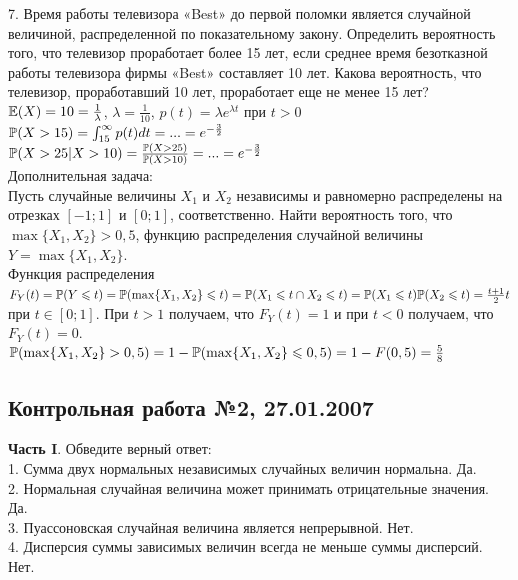 \documentclass[12pt, a4paper]{article}\usepackage[]{graphicx}\usepackage[]{color}
\begin{document}
	7.  Время работы телевизора «Best» до первой поломки является
	случайной величиной, распределенной по показательному закону.
	Определить вероятность того, что телевизор проработает более 15
	лет, если среднее время безотказной работы телевизора фирмы «Best»
	составляет 10 лет. Какова вероятность, что телевизор,
	проработавший 10 лет, проработает еще не менее 15 лет? \\

	$\E(X)=10=\frac{1}{\lambda}$, $\lambda=\frac{1}{10}$, $p(t)=\lambda
	e^{\lambda t}$ при $t>0$ \\
	$\P(X>15)=\int_{15}^{\infty}p(t)dt=...=e^{-\frac{3}{2}}$ \\
	$\P(X>25|X>10)=\frac{\P(X>25)}{\P(X>10)}=...=e^{-\frac{3}{2}}$ \\

	Дополнительная задача: \\
	Пусть случайные величины $X_{1}$ и $X_{2}$ независимы и равномерно
	распределены на отрезках $[-1;1]$ и $[0;1]$, соответственно. Найти
	вероятность того, что $\max\{X_{1},X_{2}\}>0,5$, функцию
	распределения случайной величины $Y=\max\{X_{1},X_{2}\}$. \\
	Функция распределения $F_{Y}(t)=\P(Y\le t)=\P(\max\{X_{1},X_{2}\}\le
	t)=\P(X_{1}\le t\cap X_{2}\le t)=\P(X_{1}\le t)\P(X_{2}\le
	t)=\frac{t+1}{2}t$ при $t\in [0;1]$. При $t>1$ получаем, что
	$F_{Y}(t)=1$ и при $t<0$ получаем, что $F_{Y}(t)=0$. \\
	$\P(\max\{X_{1},X_{2}\}>0,5)=1-\P(\max\{X_{1},X_{2}\}\le
	0,5)=1-F(0,5)=\frac{5}{8}$ \\




	\subsection{Контрольная работа №2, 27.01.2007}

	\textbf{Часть I}. Обведите верный ответ: \\

	1. Сумма двух нормальных независимых случайных величин нормальна.
	Да. \\

	2. Нормальная случайная величина может принимать отрицательные
	значения. Да. \\

	3. Пуассоновская случайная величина является непрерывной. Нет.
	\\

	4. Дисперсия суммы зависимых величин всегда не меньше суммы
	дисперсий. Нет. \\
\end{document}
